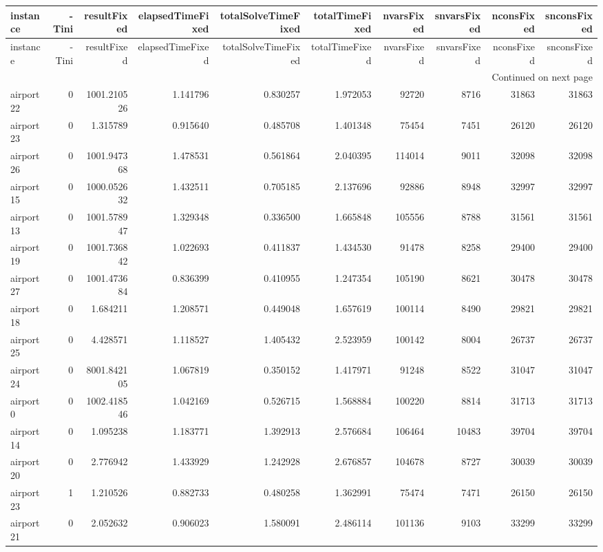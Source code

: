 
\begin{longtable}{|l|r|r|r|r|r|r|r|r|r|}
\toprule
instance & -Tini & resultFixed & elapsedTimeFixed & totalSolveTimeFixed & totalTimeFixed & nvarsFixed & snvarsFixed & nconsFixed & snconsFixed \\
\midrule
\endfirsthead
\toprule
instance & -Tini & resultFixed & elapsedTimeFixed & totalSolveTimeFixed & totalTimeFixed & nvarsFixed & snvarsFixed & nconsFixed & snconsFixed \\
\midrule
\endhead
\midrule
\multicolumn{10}{r}{Continued on next page} \\
\midrule
\endfoot
\bottomrule
\endlastfoot
airport22 & 0 & 1001.210526 & 1.141796 & 0.830257 & 1.972053 & 92720 & 8716 & 31863 & 31863 \\
airport23 & 0 & 1.315789 & 0.915640 & 0.485708 & 1.401348 & 75454 & 7451 & 26120 & 26120 \\
airport26 & 0 & 1001.947368 & 1.478531 & 0.561864 & 2.040395 & 114014 & 9011 & 32098 & 32098 \\
airport15 & 0 & 1000.052632 & 1.432511 & 0.705185 & 2.137696 & 92886 & 8948 & 32997 & 32997 \\
airport13 & 0 & 1001.578947 & 1.329348 & 0.336500 & 1.665848 & 105556 & 8788 & 31561 & 31561 \\
airport19 & 0 & 1001.736842 & 1.022693 & 0.411837 & 1.434530 & 91478 & 8258 & 29400 & 29400 \\
airport27 & 0 & 1001.473684 & 0.836399 & 0.410955 & 1.247354 & 105190 & 8621 & 30478 & 30478 \\
airport18 & 0 & 1.684211 & 1.208571 & 0.449048 & 1.657619 & 100114 & 8490 & 29821 & 29821 \\
airport25 & 0 & 4.428571 & 1.118527 & 1.405432 & 2.523959 & 100142 & 8004 & 26737 & 26737 \\
airport24 & 0 & 8001.842105 & 1.067819 & 0.350152 & 1.417971 & 91248 & 8522 & 31047 & 31047 \\
airport0 & 0 & 1002.418546 & 1.042169 & 0.526715 & 1.568884 & 100220 & 8814 & 31713 & 31713 \\
airport14 & 0 & 1.095238 & 1.183771 & 1.392913 & 2.576684 & 106464 & 10483 & 39704 & 39704 \\
airport20 & 0 & 2.776942 & 1.433929 & 1.242928 & 2.676857 & 104678 & 8727 & 30039 & 30039 \\
airport23 & 1 & 1.210526 & 0.882733 & 0.480258 & 1.362991 & 75474 & 7471 & 26150 & 26150 \\
airport21 & 0 & 2.052632 & 0.906023 & 1.580091 & 2.486114 & 101136 & 9103 & 33299 & 33299 \\

\end{longtable}
